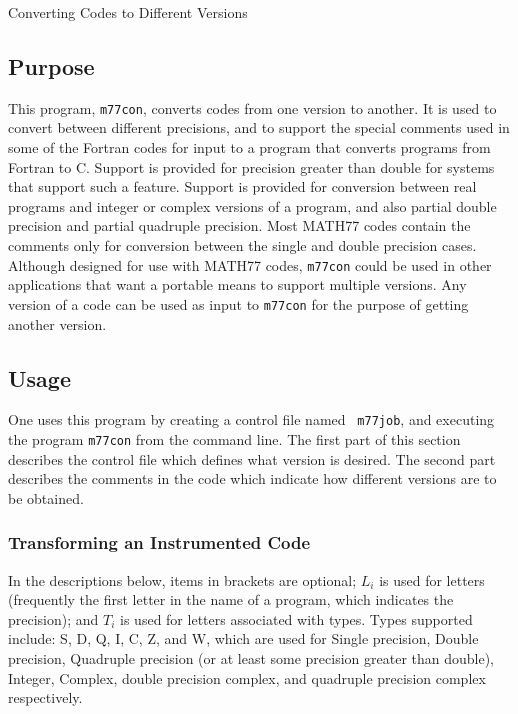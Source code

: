 \documentclass[twoside]{MATH77}
\begin{document}
  Converting Codes to Different Versions


\subsection{Purpose}

This program, {\tt m77con}, converts codes from one version to another.
It is used to convert between different precisions, and to support the
special comments used in some of the Fortran codes for input to a program
that converts programs from Fortran to C.  Support is provided for
precision greater than double for systems that support such a feature.
Support is provided for conversion between real programs and integer or
complex versions of a program, and also partial double precision and
partial quadruple precision.  Most MATH77 codes contain the comments only
for conversion between the single and double precision cases.  Although
designed for use with MATH77 codes, {\tt m77con} could be used in other
applications that want a portable means to support multiple versions.  Any
version of a code can be used as input to {\tt m77con} for the purpose of
getting another version.

\subsection{Usage}

    One uses this program by creating a control file named {\tt
m77job}, and executing the program {\tt m77con} from the command
line.  The first part of this section describes the control file which
defines what version is desired.  The second part describes the
comments in the code which indicate how different versions are to be
obtained.

\subsubsection{Transforming an Instrumented Code}

In the descriptions below, items in brackets are optional; $L_i$ is
used for letters (frequently the first letter in the name of a
program, which indicates the precision); and $T_i$ is used for
letters associated with types. Types supported include: S, D, Q, I,
C, Z, and W, which are used for Single precision, Double precision,
Quadruple precision (or at least some  precision greater than
double), Integer, Complex, double precision complex, and quadruple
precision complex respectively.
\end{document}
